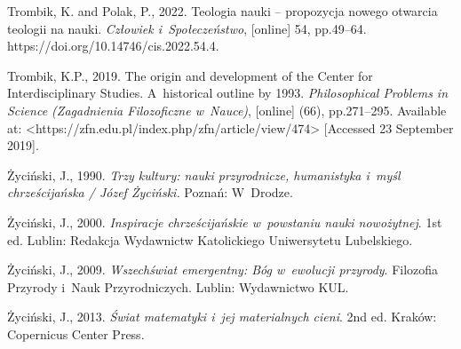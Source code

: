 Trombik, K. and Polak, P., 2022. Teologia nauki -- propozycja nowego otwarcia teologii na nauki. \textit{Człowiek i~Społeczeństwo}, [online] 54, pp.49–64. https://doi.org/10.14746/cis.2022.54.4.



Trombik, K.P., 2019. The origin and development of the Center for Interdisciplinary Studies. A~historical outline by 1993. \textit{Philosophical Problems in Science (Zagadnienia Filozoficzne w~Nauce)}, [online] (66), pp.271–295. Available at: {\textless}https://zfn.edu.pl/index.php/zfn/article/view/474{\textgreater} [Accessed 23 September 2019].



Życiński, J., 1990. \textit{Trzy kultury: nauki przyrodnicze, humanistyka i~myśl chrześcijańska / Józef Życiński.} Poznań: W~Drodze.



Życiński, J., 2000. \textit{Inspiracje chrześcijańskie w~powstaniu nauki nowożytnej}. 1st ed. Lublin: Redakcja Wydawnictw Katolickiego Uniwersytetu Lubelskiego.



Życiński, J., 2009. \textit{Wszechświat emergentny: Bóg w~ewolucji przyrody}. Filozofia Przyrody i~Nauk Przyrodniczych. Lublin: Wydawnictwo KUL.



Życiński, J., 2013. \textit{Świat matematyki i~jej materialnych cieni}. 2nd ed. Kraków: Copernicus Center Press.




